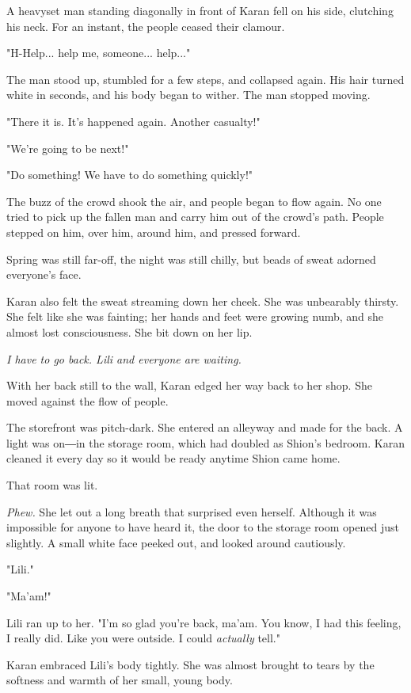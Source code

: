 A heavyset man standing diagonally in front of Karan fell on his side,
clutching his neck. For an instant, the people ceased their clamour.

"H-Help... help me, someone... help..."

The man stood up, stumbled for a few steps, and collapsed again. His
hair turned white in seconds, and his body began to wither. The man
stopped moving.

"There it is. It's happened again. Another casualty!"

"We're going to be next!"

"Do something! We have to do something quickly!"

The buzz of the crowd shook the air, and people began to flow again. No
one tried to pick up the fallen man and carry him out of the crowd's
path. People stepped on him, over him, around him, and pressed forward.

Spring was still far-off, the night was still chilly, but beads of sweat
adorned everyone's face.

Karan also felt the sweat streaming down her cheek. She was unbearably
thirsty. She felt like she was fainting; her hands and feet were growing
numb, and she almost lost consciousness. She bit down on her lip.

\emph{I have to go back. Lili and everyone are waiting.}

With her back still to the wall, Karan edged her way back to her shop.
She moved against the flow of people.

The storefront was pitch-dark. She entered an alleyway and made for the
back. A light was on―in the storage room, which had doubled as Shion's
bedroom. Karan cleaned it every day so it would be ready anytime Shion
came home.

That room was lit.

\emph{Phew.} She let out a long breath that surprised even herself. Although it
was impossible for anyone to have heard it, the door to the storage room
opened just slightly. A small white face peeked out, and looked around
cautiously.

"Lili."

"Ma'am!"

Lili ran up to her. "I'm so glad you're back, ma'am. You know, I had
this feeling, I really did. Like you were outside. I could \emph{actually}
tell."

Karan embraced Lili's body tightly. She was almost brought to tears by
the softness and warmth of her small, young body.

